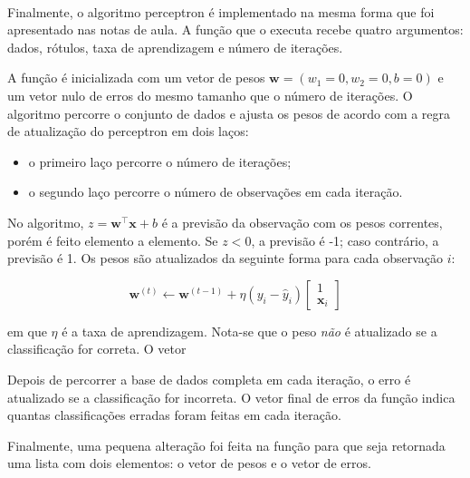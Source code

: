 \documentclass[
  a4paperpaper,
]{article}
\providecommand{\tightlist}{%
  \setlength{\itemsep}{0pt}\setlength{\parskip}{0pt}}\usepackage{longtable,booktabs,array}
\begin{document}
~

Finalmente, o algoritmo perceptron é implementado na mesma forma que foi
apresentado nas notas de aula. A função que o executa recebe quatro
argumentos: dados, rótulos, taxa de aprendizagem e número de iterações.

A função é inicializada com um vetor de pesos
\(\boldsymbol{w} = (w_1 = 0, w_2 = 0, b = 0)\) e um vetor nulo de erros
do mesmo tamanho que o número de iterações. O algoritmo percorre o
conjunto de dados e ajusta os pesos de acordo com a regra de atualização
do perceptron em dois laços:

\begin{itemize}
\tightlist
\item
  o primeiro laço percorre o número de iterações;
\item
  o segundo laço percorre o número de observações em cada iteração.
\end{itemize}

No algoritmo, \(z = \boldsymbol{w}^\top\boldsymbol{x} + b\) é a previsão
da observação com os pesos correntes, porém é feito elemento a elemento.
Se \(z < 0\), a previsão é -1; caso contrário, a previsão é 1. Os pesos
são atualizados da seguinte forma para cada observação \(i\):

\[
  \boldsymbol{w}^{(t)} \leftarrow \boldsymbol{w}^{(t-1)} + \eta (y_i - \hat{y}_i) \begin{bmatrix} 1 \\ \boldsymbol{x}_i \end{bmatrix}
\]

\noindent em que \(\eta\) é a taxa de aprendizagem. Nota-se que o peso
\emph{não} é atualizado se a classificação for correta. O vetor

Depois de percorrer a base de dados completa em cada iteração, o erro é
atualizado se a classificação for incorreta. O vetor final de erros da
função indica quantas classificações erradas foram feitas em cada
iteração.

Finalmente, uma pequena alteração foi feita na função para que seja
retornada uma lista com dois elementos: o vetor de pesos e o vetor de
erros.

~
\end{document}
